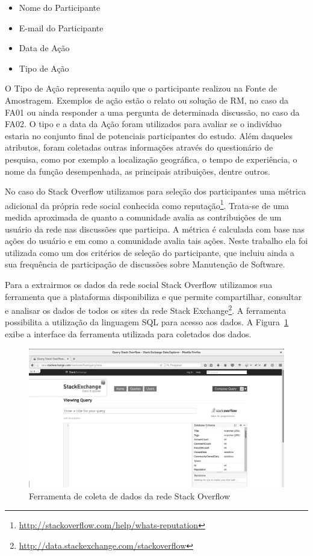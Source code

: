 \begin{itemize}
	\item Nome do Participante
	\item E-mail do Participante
	\item Data de Ação
	\item Tipo de Ação
\end{itemize}

O Tipo de Ação representa aquilo que o participante realizou na Fonte de
Amostragem. Exemplos de ação estão o relato ou solução de RM, no caso da FA01 ou
ainda responder a uma pergunta de determinada discussão, no caso da FA02. O tipo
e a data da Ação foram utilizados para avaliar se o indivíduo estaria no
conjunto final de potenciais participantes do estudo. Além daqueles atributos,
foram coletadas outras informações através do questionário de pesquisa, como por
exemplo a localização geográfica, o tempo de experiência, o nome da função
desempenhada, as principais atribuições, dentre outros.

No caso do Stack Overflow utilizamos para seleção dos participantes uma métrica
adicional da própria rede social conhecida como
reputação\footnote{\url{http://stackoverflow.com/help/whats-reputation}}.
Trata-se de uma medida aproximada de quanto a comunidade avalia as contribuições
de um usuário da rede nas discussões que participa. A métrica é calculada com
base nas ações do usuário e em como a comunidade avalia tais ações. Neste
trabalho ela foi utilizada como um dos critérios de seleção do participante, que
incluiu ainda a sua frequência de participação de discussões sobre Manutenção de
Software.

Para a extrairmos os dados da rede social Stack Overflow utilizamos sua
ferramenta que a plataforma disponibiliza e que permite compartilhar, consultar
e analisar os dados de todos os sites da rede Stack
Exchange\footnote{\url{http://data.stackexchange.com/stackoverflow}}. A
ferramenta possibilita a utilização da linguagem SQL para acesso aos dados. A
Figura~\ref{fig:stack-exchange} exibe a interface da ferramenta utilizada para
coletados dos dados.

\begin{figure}[htpb]
	\centering
	\includegraphics[width=0.5\linewidth]{./chapter-pesquisa-com-profissionais/img/stack-exchange.png}
	\caption{Ferramenta de coleta de dados da rede Stack Overflow}
\label{fig:stack-exchange}
\end{figure}

